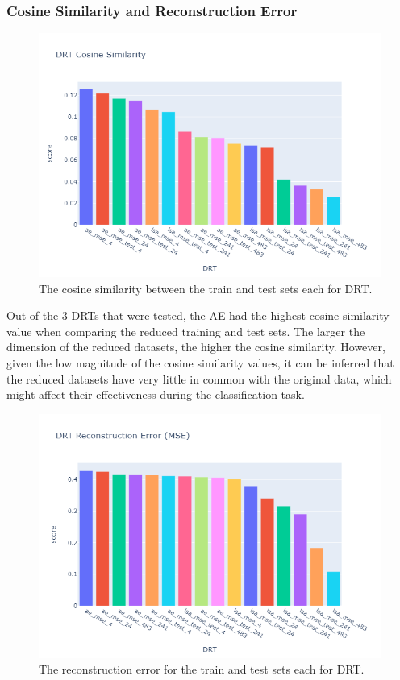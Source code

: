 \documentclass[12pt]{article}
\begin{document}
\subsubsection{Cosine Similarity and Reconstruction Error}
\begin{figure}[H]
  \centering
  \includegraphics[scale=0.60]{plots/cs.png}
  \caption{The cosine similarity between the train and test sets each for DRT.}
\end{figure}

\hspace{\parindent} Out of the 3 DRTs that were tested, the AE had the highest cosine similarity value when comparing the reduced training and test sets. The larger the dimension of the reduced datasets, the higher the cosine similarity. However, given the low magnitude of the cosine similarity values, it can be inferred that the reduced datasets have very little in common with the original data, which might affect their effectiveness during the classification task.

\begin{figure}[H]
  \centering
  \includegraphics[scale=0.60]{plots/re.png}
  \caption{The reconstruction error for the train and test sets each for DRT.}
\end{figure}
\end{document}
